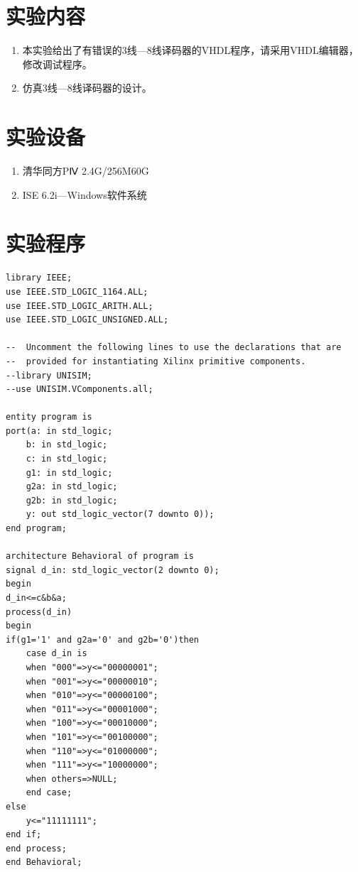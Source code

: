 \documentclass{article}
\begin{document}
\begin{CJK*}{UTF8}{gbsn}
\section{实验内容}
\begin{enumerate}
\item 本实验给出了有错误的3线—8线译码器的VHDL程序，请采用VHDL编辑器，修改调试程序。
\item 仿真3线—8线译码器的设计。
\end{enumerate}

\section{实验设备}
\begin{enumerate}
\item 清华同方PⅣ 2.4G/256M60G
\item ISE 6.2i—Windows软件系统
\end{enumerate}


\section{实验程序}
\begin{center}
\begin{lstlisting}[caption = {74138译码器的代码清单}, label = {lst: aonelst}]
library IEEE;
use IEEE.STD_LOGIC_1164.ALL;
use IEEE.STD_LOGIC_ARITH.ALL;
use IEEE.STD_LOGIC_UNSIGNED.ALL;

--  Uncomment the following lines to use the declarations that are
--  provided for instantiating Xilinx primitive components.
--library UNISIM;
--use UNISIM.VComponents.all;

entity program is
port(a: in std_logic;
	b: in std_logic;
	c: in std_logic;
	g1: in std_logic;
	g2a: in std_logic;
	g2b: in std_logic;
	y: out std_logic_vector(7 downto 0));
end program;

architecture Behavioral of program is
signal d_in: std_logic_vector(2 downto 0);
begin
d_in<=c&b&a;
process(d_in)
begin
if(g1='1' and g2a='0' and g2b='0')then
	case d_in is
	when "000"=>y<="00000001";
	when "001"=>y<="00000010";
	when "010"=>y<="00000100";
	when "011"=>y<="00001000";
	when "100"=>y<="00010000";
	when "101"=>y<="00100000";
	when "110"=>y<="01000000";
	when "111"=>y<="10000000";
	when others=>NULL;
	end case;
else
	y<="11111111";
end if;
end process;
end Behavioral;
\end{lstlisting}
\end{center}


\end{CJK*}
\end{document}
